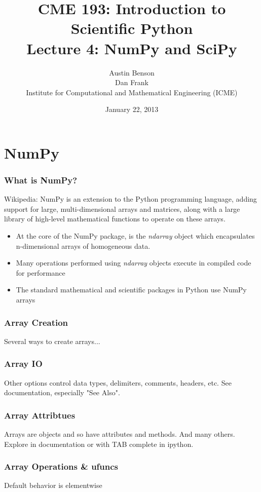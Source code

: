 \documentclass{beamer}
\title{CME 193: Introduction to Scientific Python \\
Lecture 4: NumPy and SciPy}
\author{Austin Benson \\
\vspace{0.1in}
Dan Frank \\
\vspace{0.1in}
Institute for Computational and Mathematical Engineering (ICME)}
\date{January 22, 2013}
\begin{document}
\maketitle

\section{NumPy}

\begin{frame}
\frametitle{What is NumPy?}

Wikipedia: NumPy is an extension to the Python programming language, adding support for large, multi-dimensional arrays and matrices, along with a large library of high-level mathematical functions to operate on these arrays.

\begin{itemize}
\setlength{\itemsep}{0.1in}
\item{At the core of the NumPy package, is the \textit{ndarray} object which encapsulates n-dimensional arrays of homogeneous data. 
}
\item{Many operations performed using \textit{ndarray} objects execute in compiled code for performance}
\item{The standard mathematical and scientific packages in Python use NumPy arrays}
\end{itemize}
\end{frame}

\begin{frame}
\frametitle{Array Creation}
Several ways to create arrays...
\end{frame}

\begin{frame}
\frametitle{Array IO}
Other options control data types, delimiters, comments, headers, etc.
See documentation, especially "See Also".
\end{frame}

\begin{frame}
\frametitle{Array Attribtues}
Arrays are objects and so have attributes and methods.
And many others. Explore in documentation or with TAB complete in ipython.
\end{frame}

\begin{frame}
\frametitle{Array Operations \& ufuncs}
Default behavior is elementwise 
\end{frame}
\end{document}
